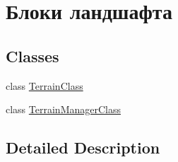\hypertarget{group___blocks}{}\section{Блоки ландшафта}
\label{group___blocks}
\subsection*{Classes}
\begin{DoxyCompactItemize}
\item 
class \hyperlink{class_terrain_class}{Terrain\+Class}
\item 
class \hyperlink{class_terrain_manager_class}{Terrain\+Manager\+Class}
\end{DoxyCompactItemize}


\subsection{Detailed Description}
